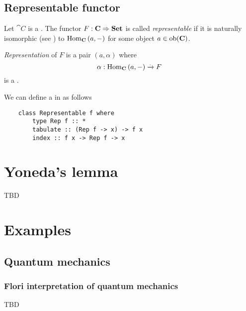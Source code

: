 \subsection{Representable functor}
\begin{definition}
\label{def:representable_functor}
Let $\cat{C}$ is a .
The functor $F: \mathbf{C} \Rightarrow \mathbf{Set}$ is called
\textit{representable} if it is naturally isomorphic (see
) to $\mathrm{Hom}_{\mathbf{C}}\left(a, -\right)$ for some object $a \in
\mathrm{ob}(\mathbf{C})$. 

\textit{Representation} of $F$ is a pair $(a, \alpha)$ where
\[
\alpha: \mathrm{Hom}_{\mathbf{C}}\left(a, -\right) \xrightarrow{.} F
\]
is a .
\end{definition}

\begin{example}
\label{ex:representable_functor_hask}
We can define a  in
 as follows
\begin{verbatim}
    class Representable f where 
        type Rep f :: *
        tabulate :: (Rep f -> x) -> f x
        index :: f x -> Rep f -> x
\end{verbatim} 
\end{example}

\section{Yoneda's lemma}

TBD

\section{Examples}

\subsection{Quantum mechanics}

\subsubsection{Flori interpretation of quantum mechanics}
TBD
